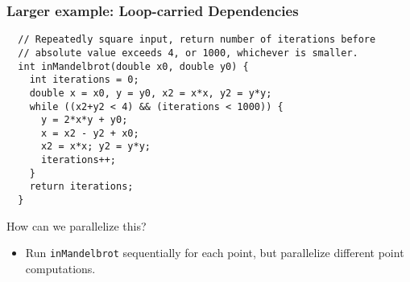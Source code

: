 \documentclass[aspectratio=43]{beamer}
\begin{document}
\begin{frame}[fragile]
\frametitle{Larger example: Loop-carried Dependencies}
{\small \begin{verbatim}
  // Repeatedly square input, return number of iterations before 
  // absolute value exceeds 4, or 1000, whichever is smaller.
  int inMandelbrot(double x0, double y0) {
    int iterations = 0;
    double x = x0, y = y0, x2 = x*x, y2 = y*y;
    while ((x2+y2 < 4) && (iterations < 1000)) {
      y = 2*x*y + y0;
      x = x2 - y2 + x0;
      x2 = x*x; y2 = y*y;
      iterations++;
    }
    return iterations;
  }
\end{verbatim} 
}
How can we parallelize this? \\
\pause
\begin{itemize}
\item Run {\tt inMandelbrot} sequentially for each point, but parallelize
different point computations.
\end{itemize}
\end{frame}
\end{document}
